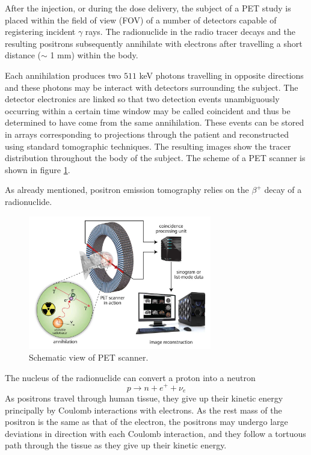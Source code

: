 After the injection, or during the dose delivery, the subject of a PET study is placed within the field of view (FOV) of a number of detectors capable of registering incident $\gamma$ rays. The radionuclide in the radio tracer decays and the resulting positrons subsequently annihilate with electrons after travelling a short distance ($\sim$ 1 mm) within the body.

Each annihilation produces two $511$ keV photons travelling in opposite directions and these photons may be interact with detectors surrounding the subject. The detector electronics are linked so that two detection events unambiguously occurring within a certain time window may be called coincident and thus be determined to have come from the same annihilation. These events can be stored in arrays corresponding to projections through the patient and reconstructed using standard tomographic techniques. The resulting images show the tracer distribution throughout the body of the subject. The scheme of a PET scanner is shown in figure  \ref{fig:PET}.

As already mentioned, positron emission tomography relies on the $\beta ^{+}$ decay of a radionuclide.
\begin{figure}
\centering  
\includegraphics[width=8cm]{Pictures/Chapter_1/PET_scheme}
\caption[PET scanner]{Schematic view of PET scanner.}
\label{fig:PET}
\end{figure}
The nucleus of the radionuclide can convert a proton into a neutron 
\begin{displaymath}
p\rightarrow n + e^{+} + \nu _{e}
\end{displaymath}
As positrons travel through human tissue, they give up their kinetic energy principally by Coulomb interactions with electrons. As the rest mass of the positron is the same as that of the electron, the positrons may undergo large deviations in direction with each Coulomb interaction, and they follow a tortuous path through the tissue as they give up their kinetic energy.

